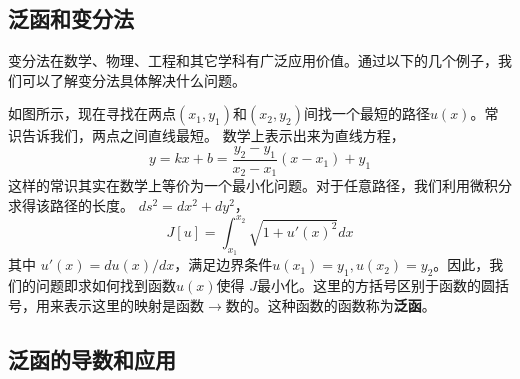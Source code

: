 \subsection{泛函和变分法}
\label{subsec:functional}
变分法在数学、物理、工程和其它学科有广泛应用价值。通过以下的几个例子，我们可以了解变分法具体解决什么问题。

如图所示，现在寻找在两点$(x_1, y_1)$和$(x_2,y_2)$间找一个最短的路径$u(x)$。常识告诉我们，两点之间直线最短。
数学上表示出来为直线方程，
\[
  y = k x + b = \frac{y_2 - y_1}{x_2 - x_1} ( x - x_1) + y_1  
\]
这样的常识其实在数学上等价为一个最小化问题。对于任意路径，我们利用微积分求得该路径的长度。
$ds^2 = dx^2 + dy^2$，
\[
J[u] = \int_{x_1}^{x_2} \sqrt{ 1 + u'(x)^2} dx    
\]
其中 $u'(x) = du(x)/dx$，满足边界条件$u(x_1) = y_1, u(x_2) = y_2$。因此，我们的问题即求如何找到函数$u(x)$使得
$J$最小化。这里的方括号区别于函数的圆括号，用来表示这里的映射是函数$\to$数的。这种函数的函数称为\textbf{泛函}。
\subsection{泛函的导数和应用}
\label{subsec:functional_applications}